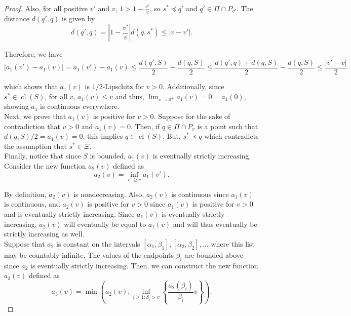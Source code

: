 \documentclass{article}
\DeclareMathOperator*{\cl}{cl}
\begin{document}
\begin{proof}
Also, for all positive $v'$ and $v$, $1 > 1- \frac {v'}{v}$, so $s^* \preceq q'$ and $q' \in \Pi \cap P_{v'}$. The distance $d(q',q)$ is given by
$$d(q',q) = \left| 1 - \frac{v'}{v} \right| d(q,s^*) \leq |v - v'|.$$

Therefore, we have
$$|a_1(v') - a_1(v)| = a_1(v') - a_1(v) \leq \frac{d(q', S)}{2} - \frac{d(q, S)}{2} \leq \frac{d(q', q) + d(q, S)}{2} - \frac{d(q, S)}{2} \leq \frac{|v'-v|}{2}$$

which shows that $a_1(v)$ is $1/2$-Lipschitz for $v>0$. Additionally, since $s^* \in \cl(S)$, for all $v$, $a_1(v) \leq v$ and thus, $\lim_{v \rightarrow 0^+} a_1(v) = 0 = a_1(0)$, showing $a_1$ is continuous everywhere.\\

Next, we prove that $a_1(v)$ is positive for $v>0$. Suppose for the sake of contradiction that $v>0$ and $a_1(v) = 0$. Then, if $q \in \Pi \cap P_v$ is a point such that $d(q, S)/2 = a_1(v) = 0$, this implies $q \in \cl (S)$. But, $s^* \prec q$ which contradicts the assumption that $s^* \in \Xi$.\\

Finally, notice that since $S$ is bounded, $a_1(v)$ is eventually strictly increasing. Consider the new function $a_2(v)$ defined as
$$a_2(v) = \inf_{v' \geq v} a_1(v').$$

By definition, $a_2(v)$ is nondecreasing. Also, $a_2(v)$ is continuous since $a_1(v)$ is continuous, and $a_2(v)$ is positive for $v>0$ since $a_1(v)$ is positive for $v>0$ and is eventually strictly increasing. Since $a_1(v)$ is eventually strictly increasing, $a_2(v)$ will eventually be equal to $a_1(v)$ and will thus eventually be strictly increasing as well.\\

Suppose that $a_2$ is constant on the intervals $[\alpha_1, \beta_1], [\alpha_2, \beta_2], \dots$ where this list may be countably infinite. The values of the endpoints $\beta_i$ are bounded above since $a_2$ is eventually strictly increasing. Then, we can construct the new function $a_3(v)$ defined as
$$a_3(v) = \min \left(a_2(v), \inf_{i \geq 1 : \beta_i > v} \left\{\frac{a_2(\beta_i)}{\beta_i} v\right\}\right).$$


\end{proof}
\end{document}
